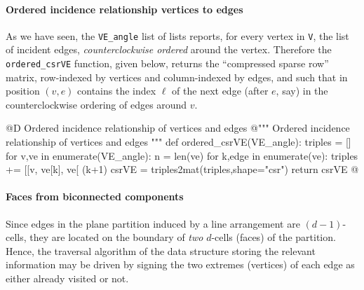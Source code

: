 \documentclass[11pt,oneside]{article}    %
\begin{document}
\paragraph{Ordered incidence relationship vertices to edges}

As we have seen, the \texttt{VE\_angle} list of lists reports, for every vertex in \texttt{V}, the list of incident edges, \emph{counterclockwise ordered} around the vertex. Therefore the \texttt{ordered\_csrVE} function, given below, returns the ``compressed sparse row'' matrix, row-indexed by vertices and column-indexed by edges, and such that in position $(v,e)$ contains the index $\ell$ of the next edge (after $e$, say) in the counterclockwise ordering of edges around $v$.

@D Ordered incidence relationship of vertices and edges
@{""" Ordered incidence relationship of vertices and edges """
def ordered_csrVE(VE_angle):
    triples = []
    for v,ve in enumerate(VE_angle):
        n = len(ve)
        for k,edge in enumerate(ve):
            triples += [[v, ve[k], ve[ (k+1)%
    csrVE = triples2mat(triples,shape="csr")
    return csrVE
@}


\paragraph{Faces from biconnected components}
Since edges in the plane partition induced by a line arrangement are $(d-1)$-cells, they are located on the boundary of \emph{two} $d$-cells (faces) of the partition. Hence, the traversal algorithm of the data structure storing the relevant information may be driven by signing the two extremes (vertices) of each edge as either already visited or not.
\end{document}
